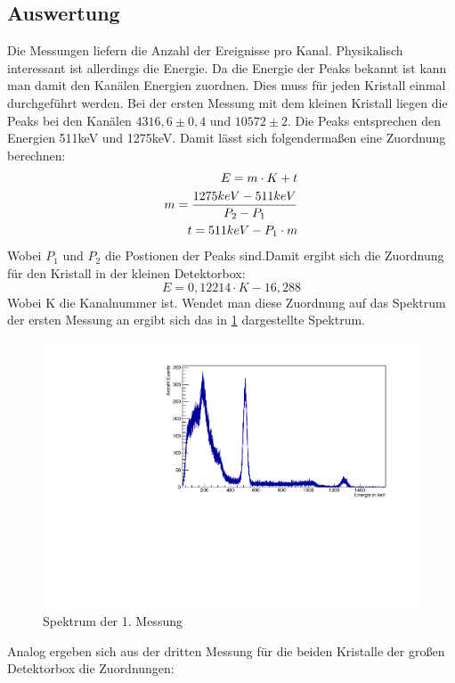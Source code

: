 \documentclass[a4paper,14pt,twoside]{article}
\begin{document}
\subsection{Auswertung}
Die Messungen liefern die Anzahl der Ereignisse pro Kanal. Physikalisch interessant ist allerdings die Energie. Da die Energie der Peaks bekannt ist kann man damit den Kanälen Energien zuordnen. Dies muss für jeden Kristall einmal durchgeführt werden. Bei der ersten Messung mit dem kleinen Kristall liegen die Peaks bei den Kanälen $4316,6\pm0,4$ und $10572\pm2$. Die Peaks entsprechen den Energien 511keV und 1275keV. 
Damit lässt sich folgendermaßen eine Zuordnung berechnen:
\begin{align}
E=m\cdot K+t\\
m={{1275keV-511keV}\over{P_2-P_1}}\\
t=511keV-P_1\cdot m
\end{align}
Wobei $P_1$ und $P_2$ die Postionen der Peaks sind.Damit ergibt sich die Zuordnung für den Kristall in der kleinen Detektorbox:
\begin{equation}
E=0,12214\cdot K-16,288
\end{equation}
Wobei K die Kanalnummer ist.
Wendet man diese Zuordnung auf das Spektrum der ersten Messung an ergibt sich das in \ref{l1} dargestellte Spektrum.
\begin{figure}[H]
	\begin{center}
		\includegraphics[width=\textwidth]{Messung11.pdf}
		\caption{Spektrum der 1. Messung}
		\label{l1}
	\end{center}
\end{figure}
Analog ergeben sich aus der dritten Messung für die beiden Kristalle der großen Detektorbox die Zuordnungen:
\end{document}
